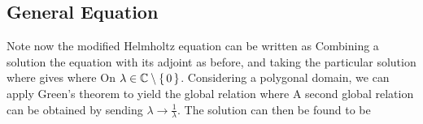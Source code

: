 \documentclass{article}
\begin{document}
\subsection{General Equation}
Note now the modified Helmholtz equation can be written as 
Combining a solution the equation with its adjoint as before, and taking the particular solution 
where 
gives 
where 
On $\lambda \in \mathbb{C}\setminus\set{0}$. Considering a polygonal domain, we can apply Green's theorem to yield the global relation 
where 
A second global relation can be obtained by sending $\lambda \to \frac{1}{\lambda}$. The solution can then be found to be 
\end{document}
